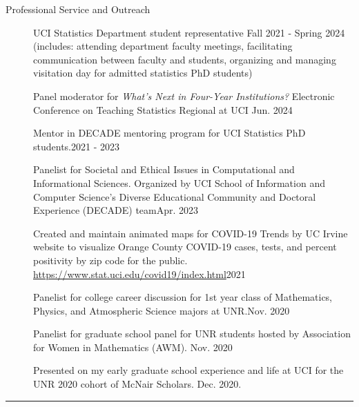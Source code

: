 \documentclass{article}
\begin{document}
	
	\begin{description}
		\vspace{-2mm}
		\item[Professional Service and Outreach]\hspace*{.1in} 
		
		UCI Statistics Department student representative \hfill{Fall 2021 - Spring 2024}\\
		(includes: attending department faculty meetings, facilitating communication between faculty and students, organizing and managing visitation day for admitted statistics PhD students)
		
		Panel moderator for \textit{What's Next in Four-Year Institutions?} Electronic Conference on Teaching Statistics Regional at UCI \hfill{Jun. 2024}
		
		Mentor in DECADE mentoring program for UCI Statistics PhD students.\hfill{2021 - 2023}
		
		Panelist for Societal and Ethical Issues in Computational and Informational Sciences. Organized by UCI School of Information and Computer Science's Diverse Educational Community and Doctoral Experience (DECADE) team\hfill{Apr. 2023}
		
		Created and maintain animated maps for COVID-19 Trends by UC Irvine website to visualize Orange County COVID-19 cases, tests, and percent positivity by zip code for the public.\\
		\url{https://www.stat.uci.edu/covid19/index.html}\hfill{2021}
		
		Panelist for college career discussion for 1st year class of Mathematics, Physics, and Atmospheric Science majors at UNR.\hfill{Nov. 2020}
		
		Panelist for graduate school panel for UNR students hosted by Association for Women in Mathematics (AWM). \hfill{Nov. 2020}
		
		Presented on my early graduate school experience and life at UCI for the UNR 2020 cohort of McNair Scholars. \hfill{Dec. 2020}.
		
	\end{description}
	\vspace{-2mm}
	\rule{\linewidth}{1pt}
	
	
	
	
\end{document}
